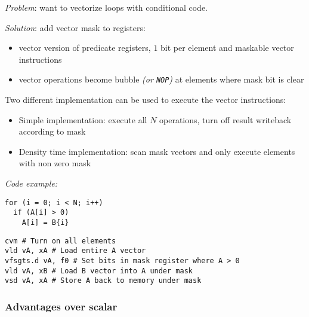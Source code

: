 \documentclass[english]{article}
\begin{document}
\textit{Problem}: want to vectorize loops with conditional code.

\textit{Solution}: add vector mask to registers:

\begin{itemize}
  \item vector version of predicate registers, \(1\) bit per element and maskable vector instructions
  \item vector operations become bubble \textit{(or \texttt{NOP})} at elements where mask bit is clear
\end{itemize}

Two different implementation can be used to execute the vector instructions:

\begin{itemize}
  \item Simple implementation: execute all \(N\) operations, turn off result writeback according to mask
  \item Density time implementation: scan mask vectors and only execute elements with non zero mask
\end{itemize}

\bigskip
\textit{Code example:}
\bigskip

\begin{minipage}{\textwidth}
  \begin{minipage}[t]{0.3\textwidth}
    \begin{verbatim}
for (i = 0; i < N; i++)
  if (A[i] > 0)
    A[i] = B{i}
    \end{verbatim}
  \end{minipage}
  \begin{minipage}[t]{0.695\textwidth}
    \begin{verbatim}
cvm # Turn on all elements
vld vA, xA # Load entire A vector
vfsgts.d vA, f0 # Set bits in mask register where A > 0
vld vA, xB # Load B vector into A under mask
vsd vA, xA # Store A back to memory under mask
    \end{verbatim}
  \end{minipage}
\end{minipage}

\subsubsection{Advantages over scalar}
\end{document}
